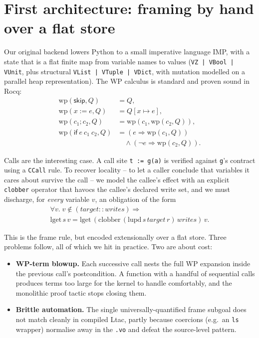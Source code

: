 \documentclass[sigconf,nonacm]{acmart}
\newcommand{\wpre}{\mathrm{wp}}
\newcommand{\lget}{\mathrm{lget}}
\newcommand{\lupd}{\mathrm{lupd}}
\newcommand{\clobber}{\mathrm{clobber}}
\newcommand{\code}[1]{\texttt{#1}}
\begin{document}
\section{First architecture: framing by hand over a flat store}
\label{sec:imp}

Our original backend lowers Python to a small imperative language IMP, with a
state that is a flat finite map from variable names to values
(\code{VZ\,|\,VBool\,|\,VUnit}, plus structural \code{VList\,|\,VTuple\,|\,VDict},
with mutation modelled on a parallel heap representation). The WP calculus is
standard and proven sound in Rocq:
\begin{align*}
\wpre(\mathsf{skip}, Q) &= Q, \\
\wpre(x := e, Q) &= Q[x \mapsto e], \\
\wpre(c_1; c_2, Q) &= \wpre(c_1, \wpre(c_2, Q)), \\
\wpre(\mathsf{if}\ e\ c_1\ c_2, Q) &= (e \Rightarrow \wpre(c_1,Q)) \\
  &\quad {}\wedge (\neg e \Rightarrow \wpre(c_2,Q)).
\end{align*}

Calls are the interesting case. A call site \code{t := g(a)} is verified against
\code{g}'s contract using a \code{CCall} rule. To recover locality -- to let a
caller conclude that variables it cares about survive the call -- we model the
callee's effect with an explicit \code{clobber} operator that havocs the callee's
declared write set, and we must discharge, for \emph{every} variable $v$, an
obligation of the form
\begin{multline*}
\forall v.\; v \notin (\textit{target} :: \textit{writes}) \Rightarrow \\
\lget\,s\,v = \lget\,(\clobber\,(\lupd\,s\,\textit{target}\,r)\,\textit{writes})\,v.
\end{multline*}

This is the frame rule, but encoded extensionally over a flat store. Three
problems follow, all of which we hit in practice. Two are about cost:

\begin{itemize}
  \item \textbf{WP-term blowup.} Each successive call nests the full WP expansion
  inside the previous call's postcondition. A function with a handful of
  sequential calls produces terms too large for the kernel to handle comfortably,
  and the monolithic proof tactic stops closing them.
  \item \textbf{Brittle automation.} The single universally-quantified frame
  subgoal does not match cleanly in compiled Ltac, partly because coercions
  (e.g.\ an \code{ls} wrapper) normalise away in the \code{.vo} and defeat the
  source-level pattern.
\end{itemize}
\end{document}
